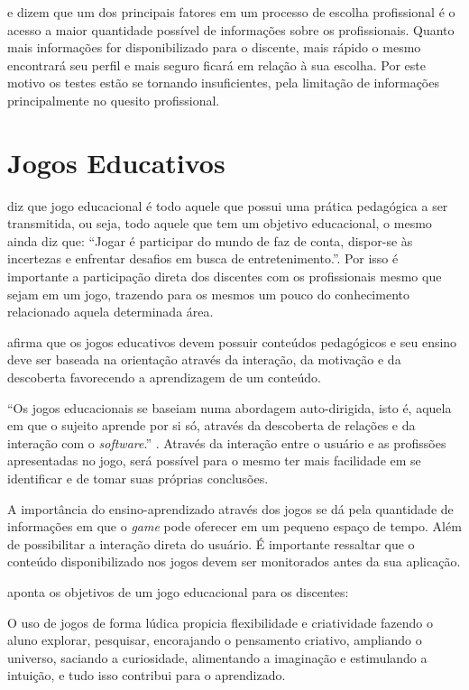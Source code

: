 \documentclass[
	12pt,				%
    oneside,			%
	a4paper,			%
	english,			%
	french,				%
	spanish,			%
	brazil,				%
	]{abntex2}
\begin{document}
 e  dizem que um dos principais fatores em um processo de escolha profissional é o acesso a maior quantidade possível de informações sobre os profissionais. Quanto mais informações for disponibilizado para o discente, mais rápido o mesmo encontrará seu perfil e mais seguro ficará em relação à sua escolha. Por este motivo os testes estão se tornando insuficientes, pela limitação de informações principalmente no quesito profissional.


\section{Jogos Educativos}

 diz que jogo educacional é todo aquele que possui uma prática pedagógica a ser transmitida, ou seja, todo aquele que tem um objetivo educacional, o mesmo ainda diz que: “Jogar é participar do mundo de faz de conta, dispor-se às incertezas e enfrentar desafios em busca de entretenimento.”. Por isso é importante a participação direta dos discentes com os profissionais mesmo que sejam em um jogo, trazendo para os mesmos um pouco do conhecimento relacionado aquela determinada área.

 afirma que os jogos educativos devem possuir conteúdos pedagógicos e seu ensino deve ser baseada na orientação através da interação, da motivação e da descoberta favorecendo a aprendizagem de um conteúdo.

\enquote{Os jogos educacionais se baseiam numa abordagem auto-dirigida, isto é, aquela em que o sujeito aprende por si só, através da descoberta de relações e da interação com o \textit{software}.} \cite{tarouco}. Através da interação entre o usuário e as profissões apresentadas no jogo, será possível para o mesmo ter mais facilidade em se identificar e de tomar suas próprias conclusões.

A importância do ensino-aprendizado através dos jogos se dá pela quantidade de informações em que o \textit{game} pode oferecer em um pequeno espaço de tempo. Além de possibilitar a interação direta do usuário. É importante ressaltar que o conteúdo disponibilizado nos jogos devem ser monitorados antes da sua aplicação. 

 aponta os objetivos de um jogo educacional para os discentes:

\begin{citacao}
O uso de jogos de forma lúdica propicia flexibilidade e criatividade fazendo o aluno explorar, pesquisar, encorajando o pensamento criativo, ampliando o universo, saciando a curiosidade, alimentando a imaginação e estimulando a intuição, e tudo isso contribui para o aprendizado. 
\end{citacao}
\end{document}
